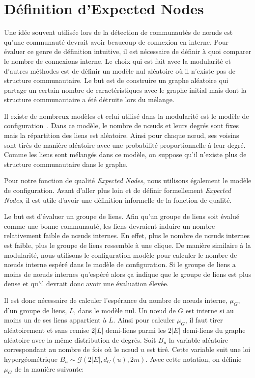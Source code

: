 \section{Définition d'Expected Nodes}

Une idée souvent utilisée lors de la détection de communautés de n\oe uds est qu'une communauté devrait avoir beaucoup de connexion en interne.
Pour évaluer ce genre de définition intuitive, il est nécessaire de définir à quoi comparer le nombre de connexions interne.
Le choix qui est fait avec la modularité et d'autres méthodes est de définir un modèle nul aléatoire où il n'existe pas de structure communautaire.
Le but est de construire un graphe aléatoire qui partage un certain nombre de caractéristiques avec le graphe initial mais dont la structure communautaire a été détruite lors du mélange.

Il existe de nombreux modèles et celui utilisé dans la modularité est le modèle de configuration~\cite{Bender1978a}.
Dans ce modèle, le nombre de n\oe uds et leurs degrés sont fixes mais la répartition des liens est aléatoire.
Ainsi pour chaque n\oe ud, ses voisins sont tirés de manière aléatoire avec une probabilité proportionnelle à leur degré.
Comme les liens sont mélangés dans ce modèle, on suppose qu'il n'existe plus de structure communautaire dans le graphe.

Pour notre fonction de qualité \emph{Expected Nodes}, nous utilisons également le modèle de configuration.
Avant d'aller plus loin et de définir formellement \emph{Expected Nodes}, il est utile d'avoir une définition informelle de la fonction de qualité.

Le but est d'évaluer un groupe de liens.
Afin qu'un groupe de liens soit évalué comme une bonne communauté, les liens devraient induire un nombre relativement faible de n\oe uds internes.
En effet, plus le nombre de n\oe uds internes est faible, plus le groupe de liens ressemble à une clique.
De manière similaire à la modularité, nous utilisons le configuration modèle pour calculer le nombre de n\oe uds interne espéré dans le modèle de configuration.
Si le groupe de liens a moins de n\oe uds internes qu'espéré alors ça indique que le groupe de liens est plus dense et qu'il devrait donc avoir une évaluation élevée.

Il est donc nécessaire de calculer l'espérance du nombre de n\oe uds interne, $\mu_{G}$, d'un groupe de liens, $L$, dans le modèle nul.
Un n\oe ud de $G$ est interne si au moins un de ses liens appartient à $L$.
Ainsi pour calculer $\mu_{G}$, il faut tirer aléatoirement et sans remise $2|L|$ demi-liens parmi les $2|E|$ demi-liens du  graphe aléatoire avec la même distribution de degrés.
Soit $B_u$ la variable aléatoire correspondant au nombre de fois où le n\oe ud $u$ est tiré.
Cette variable suit une loi  hypergéométrique $B_u \sim \mathcal{G}\left(2|E|,d_G(u),2m\right)$.
Avec cette notation, on définie $\mu_G$ de la manière suivante:

